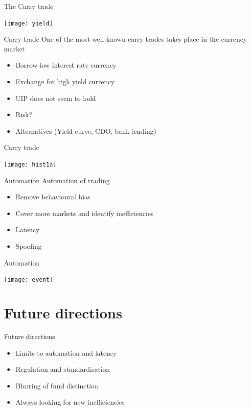 \documentclass[14pt,xcolor=pdftex,dvipsnames,table]{beamer}\usepackage[]{graphicx}\usepackage[]{color}
\begin{document}
\begin{frame}{The Carry trade}
\begin{center}
\texttt{[image: yield]}
\end{center}
\end{frame}

\begin{frame}{Carry trade}
One of the most well-known carry trades takes place in the currency market
\pause
\begin{itemize}[<+-| alert@+>]
\item Borrow low interest rate currency
\item Exchange for high yield currency
\item UIP does not seem to hold
\item Risk? 
\item Alternatives (Yield curve, CDO, bank lending)
\end{itemize}
\end{frame}

\begin{frame}{Carry trade}
\begin{center}
\texttt{[image: hist1a]}
\end{center}
\end{frame}


\begin{frame}{Automation}
Automation of trading
\pause
\begin{itemize}[<+-| alert@+>]
\item Remove behavioural bias
\item Cover more markets and identify inefficiencies
\item Latency
\item Spoofing
\end{itemize}
\end{frame}

\begin{frame}{Automation}
\begin{center}
\texttt{[image: event]}
\end{center}
\end{frame}


\section{Future directions}
\begin{frame}{Future directions}
\begin{itemize}[<+-| alert@+>]
\item Limits to automation and latency
\item Regulation and standardisation
\item Blurring of fund distinction
\item Always looking for new inefficiencies
\end{itemize}
\end{frame}
\end{document}
